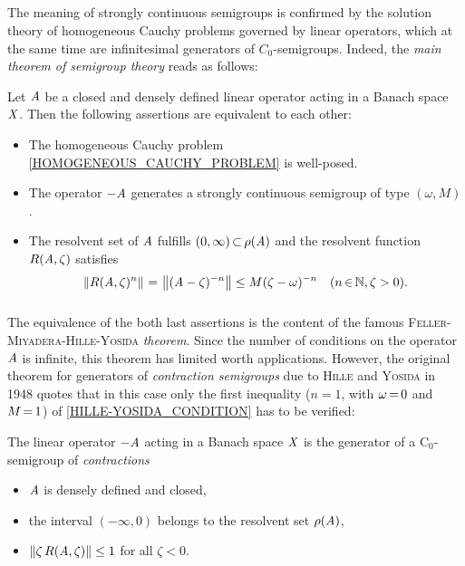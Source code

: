 \documentclass[11pt,twoside]{article}
\begin{document}
\subparagraph*{}
The meaning of strongly continuous semigroups is confirmed
by the solution theory of homogeneous Cauchy problems
governed by linear operators,
which at the same time are infinitesimal generators of $C_0$-semigroups.
Indeed,
the \textit{main theorem of semigroup theory} reads as follows:

\begin{theorem}\label{MAIN_THEOREM_OF_SEMIGROUP_THEORY}
Let $\mathit{A}$ be a closed and densely defined linear operator
acting in a Banach space $\mathit{X}$.
Then the following assertions are equivalent to each other:

\begin{itemize}[leftmargin=12pt]
\item[1.]
The homogeneous Cauchy problem \eqref{HOMOGENEOUS_CAUCHY_PROBLEM}
is well-posed.
\item[2.]
The operator $-\mathit{A}$ generates a strongly continuous semigroup
of type $(\omega,M)$.
\item[3.]
The resolvent set of $\mathit{A}$ fulfills $(0,\infty) {\,\subset\,} \rho(\mathit{A})$
and the resolvent function $R(\mathit{A},\zeta)$ satisfies
\begin{equation}\label{HILLE-YOSIDA_CONDITION}
\left\lVert R(\mathit{A},\zeta)^n \right\rVert {\,=\,} \left\lVert (\mathit{A} - \zeta)^{-n} \right\rVert
\leq M (\zeta - \omega)^{-n} \quad (n {\,\in\,} {\mathbb{N}}, \zeta >0).
\end{equation}
\end{itemize}
\end{theorem}

\subparagraph*{}
The equivalence of the both last assertions is the content
of the famous \textsc{Feller-Miyadera-Hille-Yosida} \textit{theorem}.
Since the number of conditions on the operator $\mathit{A}$ is infinite,
this theorem has limited worth {\wrt} applications.
However,
the original theorem
for generators of \textit{contraction semigroups}
due to \textsc{Hille} and \textsc{Yosida} in 1948 quotes
that in this case only the first inequality
($n=1$, with $\omega {\,=\,} 0$ and $M {\,=\,} 1$)
of \eqref{HILLE-YOSIDA_CONDITION} has to be verified:

\begin{theorem}\label{HILLE-YOSIDA_THEOREM}
The linear operator $-\mathit{A}$ acting in a Banach space $\mathit{X}$
is the generator of a C$_0$-semigroup of \textit{contractions}
\iff
\begin{itemize}[leftmargin=12pt]
\item[1.]
$\mathit{A}$ is densely defined and closed,
\item[2.]
the interval $(-\infty,0)$ belongs to the resolvent set $\rho(\mathit{A})$,
\item[3.]
$\left\lVert \zeta \, R(\mathit{A},\zeta)  \right\rVert \leq 1$ for all $\zeta < 0$.
\end{itemize}
\end{theorem}
\end{document}
